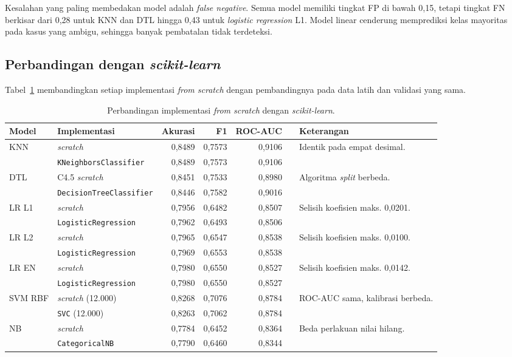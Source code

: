 Kesalahan yang paling membedakan model adalah \textit{false negative}. Semua model memiliki tingkat FP di bawah 0,15, tetapi tingkat FN berkisar dari 0,28 untuk KNN dan DTL hingga 0,43 untuk \textit{logistic regression} L1. Model linear cenderung memprediksi kelas mayoritas pada kasus yang ambigu, sehingga banyak pembatalan tidak terdeteksi.

\subsection{Perbandingan dengan \textit{scikit-learn}}
Tabel~\ref{tab:sklearn} membandingkan setiap implementasi \textit{from scratch} dengan pembandingnya pada data latih dan validasi yang sama.

\begin{table}[htbp]
    \centering
    \small
    \setlength{\tabcolsep}{4pt}
    \begin{tabularx}{\textwidth}{@{}l l r r r r X@{}}
        \toprule
        Model & Implementasi & Akurasi & F1 & ROC-AUC & & Keterangan \\
        \midrule
        KNN & \textit{scratch} & 0,8489 & 0,7573 & 0,9106 & & \multirow{2}{=}{Identik pada empat desimal.} \\
            & \texttt{KNeighborsClassifier} & 0,8489 & 0,7573 & 0,9106 & & \\
        DTL & C4.5 \textit{scratch} & 0,8451 & 0,7533 & 0,8980 & & \multirow{2}{=}{Algoritma \textit{split} berbeda.} \\
            & \texttt{DecisionTreeClassifier} & 0,8446 & 0,7582 & 0,9016 & & \\
        LR L1 & \textit{scratch} & 0,7956 & 0,6482 & 0,8507 & & \multirow{2}{=}{Selisih koefisien maks. 0,0201.} \\
            & \texttt{LogisticRegression} & 0,7962 & 0,6493 & 0,8506 & & \\
        LR L2 & \textit{scratch} & 0,7965 & 0,6547 & 0,8538 & & \multirow{2}{=}{Selisih koefisien maks. 0,0100.} \\
            & \texttt{LogisticRegression} & 0,7969 & 0,6553 & 0,8538 & & \\
        LR EN & \textit{scratch} & 0,7980 & 0,6550 & 0,8527 & & \multirow{2}{=}{Selisih koefisien maks. 0,0142.} \\
            & \texttt{LogisticRegression} & 0,7980 & 0,6550 & 0,8527 & & \\
        SVM RBF & \textit{scratch} (12.000) & 0,8268 & 0,7076 & 0,8784 & & \multirow{2}{=}{ROC-AUC sama, kalibrasi berbeda.} \\
            & \texttt{SVC} (12.000) & 0,8263 & 0,7062 & 0,8784 & & \\
        NB & \textit{scratch} & 0,7784 & 0,6452 & 0,8364 & & \multirow{2}{=}{Beda perlakuan nilai hilang.} \\
            & \texttt{CategoricalNB} & 0,7790 & 0,6460 & 0,8344 & & \\
        \bottomrule
    \end{tabularx}
    \caption{Perbandingan implementasi \textit{from scratch} dengan \textit{scikit-learn}.}
    \label{tab:sklearn}
\end{table}


